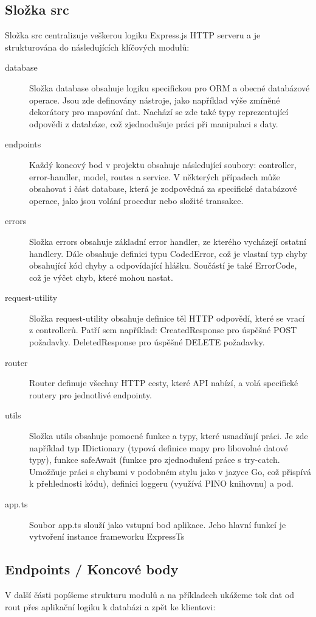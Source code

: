 \subsection{Složka src}
Složka src centralizuje veškerou logiku Express.js HTTP serveru a je strukturována do následujících klíčových modulů:
\begin{description}
    \item[database] 
    Složka database obsahuje logiku specifickou pro ORM a obecné databázové operace. Jsou zde definovány nástroje, jako například výše zmíněné dekorátory pro mapování dat. Nachází se zde také typy reprezentující odpovědi z databáze, což zjednodušuje práci při manipulaci s daty.
    \item[endpoints]
    Každý koncový bod v projektu obsahuje následující soubory: controller, error-handler, model, routes a service. V některých případech může obsahovat i část database, která je zodpovědná za specifické databázové operace, jako jsou volání procedur nebo složité transakce.
    \item[errors] 
    Složka errors obsahuje základní error handler, ze kterého vycházejí ostatní handlery. Dále obsahuje definici typu CodedError, což je vlastní typ chyby obsahující kód chyby a odpovídající hlášku. Součástí je také ErrorCode, což je výčet chyb, které mohou nastat.
    \item[request-utility] 
    Složka request-utility obsahuje definice těl HTTP odpovědí, které se vrací z controllerů. Patří sem například:
    CreatedResponse pro úspěšné POST požadavky.
    DeletedResponse pro úspěšné DELETE požadavky.
    \item[router] 
    Router definuje všechny HTTP cesty, které API nabízí, a volá specifické routery pro jednotlivé endpointy.
    \item[utils] 
    Složka utils obsahuje pomocné funkce a typy, které usnadňují práci. Je zde například typ IDictionary (typová definice mapy pro libovolné datové typy), funkce safeAwait (funkce pro zjednodušení práce s try-catch. Umožňuje práci s chybami v podobném stylu jako v jazyce Go, což přispívá k přehlednosti kódu), definici loggeru (využívá PINO knihovnu) a pod.
    \item[app.ts] 
    Soubor app.ts slouží jako vstupní bod aplikace. Jeho hlavní funkcí je vytvoření instance frameworku ExpressTs
\end{description} 

\subsection{Endpoints / Koncové body}
V další části popíšeme strukturu modulů a na příkladech ukážeme tok dat od rout přes aplikační logiku k databázi a zpět ke klientovi:


